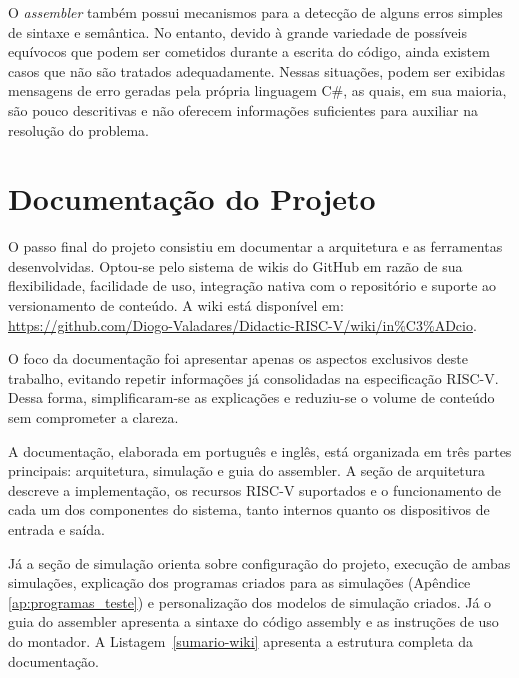 \documentclass[
	12pt,				%
	openright,			%
	oneside,			%
	a4paper,			%
	english,			%
	french,				%
	spanish,			%
	brazil,				%
	]{abntex2}
\begin{document}
O \textit{assembler} também possui mecanismos para a detecção de alguns erros simples de sintaxe e semântica. No entanto, devido à grande variedade de possíveis equívocos que podem ser cometidos durante a escrita do código, ainda existem casos que não são tratados adequadamente. Nessas situações, podem ser exibidas mensagens de erro geradas pela própria linguagem C\#, as quais, em sua maioria, são pouco descritivas e não oferecem informações suficientes para auxiliar na resolução do problema.

\section{Documentação do Projeto}

O passo final do projeto consistiu em documentar a arquitetura e as ferramentas desenvolvidas. Optou-se pelo sistema de wikis do GitHub em razão de sua flexibilidade, facilidade de uso, integração nativa com o repositório e suporte ao versionamento de conteúdo. A wiki está disponível em:
\url{https://github.com/Diogo-Valadares/Didactic-RISC-V/wiki/in%C3%ADcio}.

O foco da documentação foi apresentar apenas os aspectos exclusivos deste trabalho, evitando repetir informações já consolidadas na especificação RISC-V. Dessa forma, simplificaram-se as explicações e reduziu-se o volume de conteúdo sem comprometer a clareza.

A documentação, elaborada em português e inglês, está organizada em três partes principais: arquitetura, simulação e guia do assembler. A seção de arquitetura descreve a implementação, os recursos RISC-V suportados e o funcionamento de cada um dos componentes do sistema, tanto internos quanto os dispositivos de entrada e saída.

Já a seção de simulação orienta sobre configuração do projeto, execução de ambas simulações, explicação dos programas criados para as simulações (Apêndice \ref{ap:programas_teste}) e personalização dos modelos de simulação criados. Já o guia do assembler apresenta a sintaxe do código assembly e as instruções de uso do montador. A Listagem~\ref{sumario-wiki} apresenta a estrutura completa da documentação.
\end{document}
